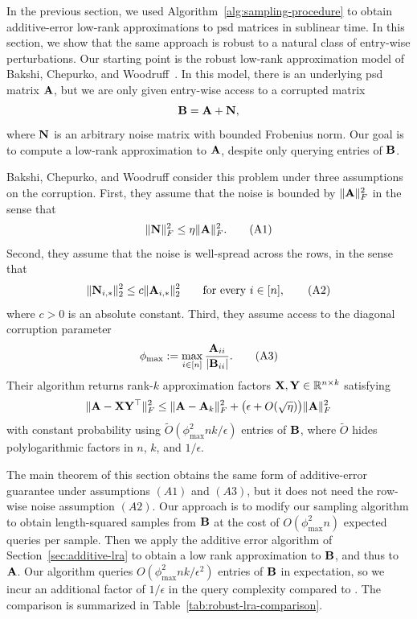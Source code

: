 In the previous section, we used Algorithm~\ref{alg:sampling-procedure} to obtain additive-error low-rank approximations to psd matrices in sublinear time. In this section, we show that the same approach is robust to a natural class of entry-wise perturbations. Our starting point is the robust low-rank approximation model of Bakshi, Chepurko, and Woodruff~\cite{bakshi_robust_2020}. In this model, there is an underlying psd matrix \(\mathbf{A}\), but we are only given entry-wise access to a corrupted matrix
\[
    \mathbf{B} = \mathbf{A} + \mathbf{N},
\]
where \(\mathbf{N}\) is an arbitrary noise matrix with bounded Frobenius norm. Our goal is to compute a low-rank approximation to \(\mathbf{A}\), despite only querying entries of \(\mathbf{B}\).

Bakshi, Chepurko, and Woodruff \cite{bakshi_robust_2020} consider this problem under three assumptions on the corruption. First, they assume that the noise is bounded by $\|\mathbf{A}\|^2_F$ in the sense that
\[
    \|\mathbf{N}\|_F^2 \leq \eta \|\mathbf{A}\|_F^2. \tag{A1}
\]
Second, they assume that the noise is well-spread across the rows, in the sense that
\[
    \|\mathbf{N}_{i,*}\|_2^2
    \leq
    c\|\mathbf{A}_{i,*}\|_2^2
    \qquad\text{for every }i\in[n],\tag{A2}
\]
where \(c>0\) is an absolute constant. Third, they assume access to the diagonal corruption parameter
\[
    \phi_{\max}
    :=
    \max_{i\in[n]} \frac{\mathbf{A}_{ii}}{|\mathbf{B}_{ii}|}.\tag{A3}
\]
Their algorithm returns rank-\(k\) approximation factors \(\mathbf{X}, \mathbf{Y}\in\mathbb{R}^{n\times k}\) satisfying
\[
    \|\mathbf{A}-\mathbf{X}\mathbf{Y}^\top\|_F^2
    \leq
    \|\mathbf{A}-\mathbf{A}_k\|_F^2
    +
    \bigl(\epsilon + O(\sqrt{\eta})\bigr)\|\mathbf{A}\|_F^2
\]
with constant probability using
\(
    \widetilde{O}\left({\phi_{\max}^2 n k}/{\epsilon}\right)
\)
entries of \(\mathbf{B}\), where $\widetilde O$ hides polylogarithmic factors in $n$, $k$, and $1/\epsilon$.

The main theorem of this section obtains the same form of additive-error guarantee under assumptions \((A1)\) and \((A3)\), but it does not need the row-wise noise assumption \((A2)\).  Our approach is to modify our sampling algorithm to obtain length-squared samples from $\mathbf{B}$ at the cost of $O(\phi_{\max}^2n)$ expected queries per sample. Then we apply the additive error algorithm of Section~\ref{sec:additive-lra} to obtain a low rank approximation to $\mathbf{B}$, and thus to $\mathbf{A}$. Our algorithm queries
\(
    O\left({\phi_{\max}^2 n k}/{\epsilon^2}\right)
\)
entries of \(\mathbf{B}\) in expectation, so we incur an additional factor of \(1/\epsilon\) in the query complexity compared to \cite{bakshi_robust_2020}. The comparison is summarized in Table~\ref{tab:robust-lra-comparison}.

